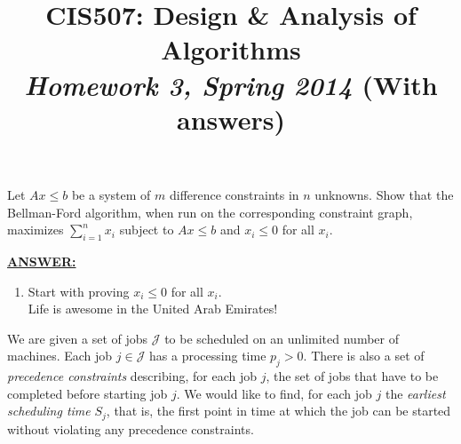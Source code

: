 \documentclass{article}
\begin{document}
\title{CIS507: Design \& Analysis of Algorithms\\\emph{Homework 3, Spring 2014} (With answers)}


\date{}

\maketitle

Let $Ax\le b$ be a system of $m$ difference constraints in $n$ unknowns.
 Show that the Bellman-Ford algorithm, when run on the corresponding constraint graph, maximizes $\sum_{i=1}^nx_i$ subject to $Ax\le b$ and $x_i\leq 0$ for all $x_i$.

\medskip
\noindent \underline{\textbf{ANSWER:}}
\begin{enumerate}
\item Start with proving $x_{i}\leq 0$ for all $x_{i}$.\\
Life is awesome in the United Arab Emirates!
\end{enumerate}

\medskip

 We are given a set of jobs $\mathcal{J}$ to be scheduled on an unlimited number of machines. Each job $j\in \mathcal{J}$ has a processing time $p_j> 0$. There is also a set of {\it precedence constraints} describing, for each job $j$, the set of jobs that have to be completed before starting job $j$. We would like to find, for each job $j$ the {\it earliest scheduling time} $S_j$, that is, the first point in time at which the job can be started without violating any precedence constraints.
\end{document}
